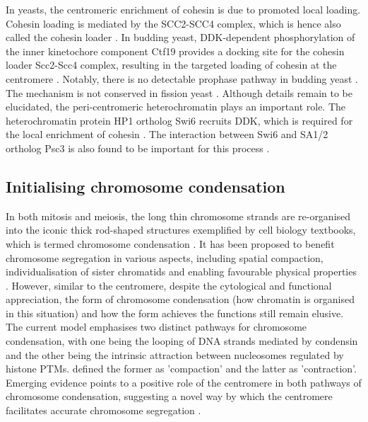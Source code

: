In yeasts, the centromeric enrichment of cohesin is due to promoted local loading. Cohesin loading is mediated by the SCC2-SCC4 complex, which is hence also called the cohesin loader \citep{Ciosk2000CohesinsProteins, Gillespie2004Scc2Extracts, Watrin2006HumanProgression, Tonkin2004NIPBLSyndrome}. In budding yeast, DDK-dependent phosphorylation of the inner kinetochore component Ctf19 provides a docking site for the cohesin loader Scc2-Scc4 complex, resulting in the targeted loading of cohesin at the centromere \citep{Hinshaw2015StructuralLoading, Hinshaw2017TheComplex, Fernius2009EstablishmentCsm3, Fernius2013Cohesin-DependentEstablishment, Natsume2013KinetochoresRecruitment}. Notably, there is no detectable prophase pathway in budding yeast \citep{Indjeian2005a}. The mechanism is not conserved in fission yeast \citep{PeytonJones2022CohesinPombe}. Although details remain to be elucidated, the peri-centromeric heterochromatin plays an important role. The heterochromatin protein HP1 ortholog Swi6 recruits DDK, which is required for the local enrichment of cohesin \citep{Bailis2003Hsk1Dfp1Centromeres}. The interaction between Swi6 and SA1/2 ortholog Psc3 is also found to be important for this process \citep{Nonaka2001RecruitmentYeast, Bernard2001RequirementCentromeres, Yamagishi2008}. 

\subsection{Initialising chromosome condensation}

In both mitosis and meiosis, the long thin chromosome strands are re-organised into the iconic thick rod-shaped structures exemplified by cell biology textbooks, which is termed chromosome condensation \citep{Antonin2016ChromosomeMitosis, Piskadlo2016NovelCondensation}. It has been proposed to benefit chromosome segregation in various aspects, including spatial compaction, individualisation of sister chromatids and enabling favourable physical properties \citep{Antonin2016ChromosomeMitosis, Piskadlo2016NovelCondensation, Beseda2020MitoticVariability, Takahashi2019FoldingChromosomes}. However, similar to the centromere, despite the cytological and functional appreciation, the form of chromosome condensation (how chromatin is organised in this situation) and how the form achieves the functions still remain elusive. The current model emphasises two distinct pathways for chromosome condensation, with one being the looping of DNA strands mediated by condensin and the other being the intrinsic attraction between nucleosomes regulated by histone PTMs. \cite{Kruitwagen2015a} defined the former as 'compaction' and the latter as 'contraction'. Emerging evidence points to a positive role of the centromere in both pathways of chromosome condensation, suggesting a novel way by which the centromere facilitates accurate chromosome segregation \citep{Leonard2015, Wilkins2014AMitosis, Kruitwagen2018, Hendzel1997Mitosis-specificCondensation, Oliveira2007CondensinChromosomes, Chan2004CondensinDivisions, Hagstrom2002C.Meiosis, Maddox2006MolecularAssay, Maddox2007FunctionalChromatin, Wenda2021MitoticElegans}. 


